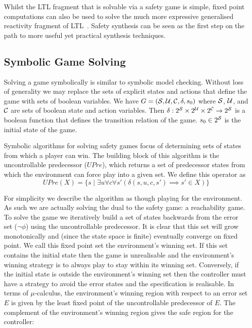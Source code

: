 
Whilst the LTL fragment that is solvable via a safety game is simple, fixed point computations can also be used to solve the much more expressive generalised reactivity fragment of LTL~\cite{Piterman15}. Safety synthesis can be seen as the first step on the path to more useful yet practical synthesis techniques.

\subsection{Symbolic Game Solving}

Solving a game symbolically is similar to symbolic model checking. Without loss of generality we may replace the sets of explicit states and actions that define the game with sets of boolean variables. We have $G = (\mathcal{S}, \mathcal{U}, \mathcal{C}, \delta, s_0)$ where $\mathcal{S}$, $\mathcal{U}$, and $\mathcal{C}$ are sets of boolean state and action variables. Then $\delta : 2^{\mathcal{S}} \times 2^{\mathcal{U}} \times 2^{\mathcal{C}} \to 2^{\mathcal{S}}$ is a boolean function that defines the transition relation of the game. $s_0 \in 2^{\mathcal{S}}$ is the initial state of the game.

Symbolic algorithms for solving safety games focus of determining sets of states from which a player can win.  The building block of this algorithm is the uncontrollable predecessor ($UPre$), which returns a set of predecessor states from which the environment can force play into a given set. We define this operator as $$UPre(X) = \{ s \mid \exists u \forall c \forall s' (\delta(s, u, c, s') \implies s' \in X) \}$$

For simplicity we describe the algorithm as though playing for the environment. As such we are actually solving the dual to the safety game: a reachability game.  To solve the game we iteratively build a set of states backwards from the error set ($\lnot \phi$) using the uncontrollable predecessor. It is clear that this set will grow monotonically and (since the state space is finite) eventually converge on fixed point. We call this fixed point set the environment's winning set. If this set contains the initial state then the game is unrealisable and the environment's winning strategy is to always play to stay within its winning set. Conversely, if the initial state is outside the environment's winning set then the controller must have a strategy to avoid the error states and the specification is realisable. In terms of $\mu$-calculus, the environment's winning region with respect to an error set $E$ is given by the least fixed point of the uncontrollable predecessor of $E$. The complement of the environment's winning region gives the safe region for the controller:

